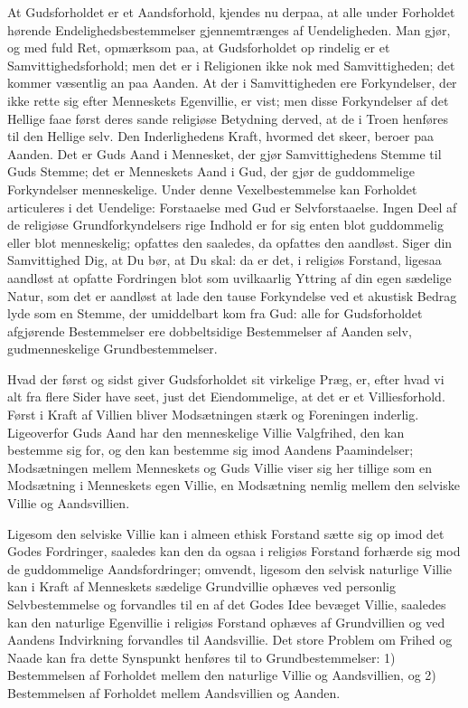\documentclass[12pt]{book}
\begin{document}
At Gudsforholdet er et Aandsforhold, kjendes nu derpaa, at alle
under Forholdet hørende Endelighedsbestemmelser gjennemtrænges af
Uendeligheden. Man gjør, og med fuld Ret, opmærksom paa, at
Gudsforholdet op\-
rindelig er et Samvittighedsforhold; men det er i Religionen ikke
nok med Samvittigheden; det kommer væsentlig an paa Aanden. At der i
Samvittigheden ere Forkyndelser, der ikke rette sig efter Menneskets
Egenvillie, er vist; men disse Forkyndelser af det Hellige faae
først deres sande religiøse Betydning derved, at de i Troen henføres
til den Hellige selv. Den Inderlighedens Kraft, hvormed det skeer,
beroer paa Aanden. Det er Guds Aand i Mennesket, der gjør
Samvittighedens Stemme til Guds Stemme; det er Menneskets Aand i
Gud, der gjør de guddommelige Forkyndelser menneskelige. Under denne
Vexelbestemmelse kan Forholdet articuleres i det Uendelige:
Forstaaelse med Gud er Selvforstaaelse. Ingen Deel af de religiøse
Grundforkyndelsers rige Indhold er for sig enten blot guddommelig
eller blot menneskelig; opfattes den saaledes, da opfattes den
aandløst. Siger din Samvittighed Dig, at Du bør, at Du skal: da er
det, i religiøs Forstand, ligesaa aandløst at opfatte Fordringen
blot som uvilkaarlig Yttring af din egen sædelige Natur, som det er
aandløst at lade den tause Forkyndelse ved et akustisk Bedrag lyde
som en Stemme, der umiddelbart kom fra Gud: alle for Gudsforholdet
afgjørende Bestemmelser ere dobbeltsidige Bestemmelser af Aanden
selv, gudmenneskelige Grundbestemmelser.

Hvad der først og sidst giver Gudsforholdet sit virkelige Præg, er,
efter hvad vi alt fra flere Sider have seet, just det Eiendommelige,
at det er et Villiesforhold. Først i Kraft af Villien bliver
Modsætningen stærk og Foreningen inderlig. Ligeoverfor Guds Aand har
den menneskelige Villie Valgfrihed, den kan bestemme sig for, og den
kan bestemme sig imod Aandens Paamindelser; Modsætningen mellem
Menneskets og Guds Villie viser sig her tillige som en Modsætning i
Menneskets egen Villie, en Modsætning nemlig mellem den selviske
Villie og Aandsvillien.

Ligesom den selviske Villie kan i almeen ethisk Forstand sætte sig
op imod det Godes Fordringer, saaledes kan den da ogsaa i religiøs
Forstand forhærde sig mod de guddommelige Aandsfordringer; omvendt,
ligesom den selvisk naturlige Villie kan i Kraft af Menneskets
sædelige Grundvillie ophæves ved personlig Selvbestemmelse og
forvandles til en af det Godes Idee bevæget Villie, saaledes kan den
naturlige Egenvillie i religiøs Forstand ophæves af Grundvillien og
ved Aandens Indvirkning forvandles til Aandsvillie. Det store
Problem om Frihed og Naade kan fra dette Synspunkt henføres til to
Grundbestemmelser: 1) Bestemmelsen af Forholdet mellem den naturlige
Villie og Aandsvillien, og 2) Bestemmelsen af Forholdet mellem
Aandsvillien og Aanden.
\end{document}
